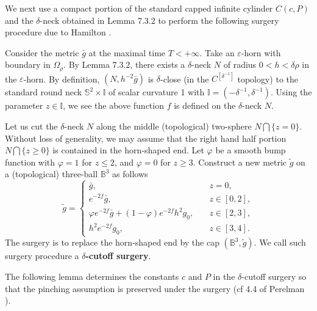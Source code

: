 We next use a compact portion of the standard capped infinite
cylinder $C(c,P)$ and the $\delta$-neck obtained in Lemma 7.3.2 to
perform the following surgery procedure due to Hamilton
\cite{Ha97}.

Consider the metric $\bar{g}$ at the maximal time $T<+\infty$.
Take an $\varepsilon$-horn with boundary in $\Omega_\rho$. By
Lemma 7.3.2, there exists a $\delta$-neck $N$ of radius
$0<h<\delta \rho$ in the $\varepsilon$-horn. By definition,
$(N,h^{-2}\bar{g})$ is $\delta$-close (in the $C^{[\delta^{-1}]}$
topology) to the standard round neck $\mathbb{S}^2\times
\mathbb{I}$ of scalar curvature 1 with
$\mathbb{I}=(-\delta^{-1},\delta^{-1})$. Using the parameter $z
\in \mathbb{I}$, we see the above function $f$ is defined on the
$\delta$-neck $N$.

Let\; us\; cut\; the\; $\delta$-neck\; $N$\; along\; the\;
middle\; (topological)\; two-sphere $N\bigcap\{z=0\}$. Without
loss of generality, we may assume that the right hand half portion
$N\bigcap\{z\geq 0\}$ is contained in the horn-shaped end. Let
$\varphi$ be a smooth bump function with $\varphi = 1$ for
$z\leq2$, and $\varphi = 0$ for $z\geq3$. Construct a new metric
$\tilde{g}$ on a (topological) three-ball $\mathbb{B}^3$ as
follows \begin{equation}
   \tilde{g} =  \begin{cases}
    \bar{g}, &\quad z= 0, \\[1mm]
    e^{-2f}\bar{g},&\quad  z \in [0,2], \\[1mm]
    \varphi e^{-2f}\bar{g} + (1-\varphi)e^{-2f}h^2g_0,
&\quad z \in [2,3], \\[1mm]
    h^2e^{-2f}g_0, &\quad z\in [3,4].
\end{cases}  %
\end{equation} The surgery is to replace the horn-shaped end by the cap
$(\mathbb{B}^3,\tilde{g})$. We call such surgery procedure a
\textbf{$\delta$-cutoff surgery}.

The following lemma determines the constants $c$ and $P$ in the
$\delta$-cutoff surgery so that the pinching assumption is
preserved under the surgery (cf 4.4 of Perelman \cite{P2}).

